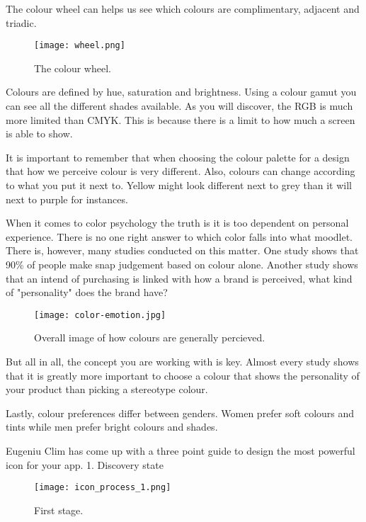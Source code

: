 The colour wheel can helps us see which colours are complimentary, adjacent and triadic. 
\begin{figure}[H]
\centering
\texttt{[image: wheel.png]}
\caption{The colour wheel. \cite{Colour}}
\end{figure}

Colours are defined by hue, saturation and brightness. 
Using a colour gamut you can see all the different shades available. As you will discover, the RGB is much more limited than CMYK. This is because there is a limit to how much a screen is able to show. 

It is important to remember that when choosing the colour palette for a design that how we perceive colour is very different. Also, colours can change according to what you put it next to. Yellow might look different next to grey than it will next to purple for instances. \cite{Colour}

When it comes to color psychology the truth is it is too dependent on personal experience. There is no one right answer to which color falls into what moodlet. \cite{ColourMeaning}
There is, however, many studies conducted on this matter. 
One study shows that 90\% of people make snap judgement based on colour alone. \cite{ColourMeaning} Another study shows that an intend of purchasing is linked with how a brand is perceived, what kind of "personality" does the brand have?\cite{ColourMeaning}

\begin{figure}[H]
\centering
\texttt{[image: color-emotion.jpg]}
\caption{Overall image of how colours are generally percieved. \cite{ColourMeaning}}
\end{figure}

But all in all, the concept you are working with is key. Almost every study shows that it is greatly more important to choose a colour that shows the personality of your product than picking a stereotype colour. \cite{ColourMeaning}

Lastly, colour preferences differ between genders. Women prefer soft colours and tints while men prefer bright colours and shades. \cite{ColourMeaning} 


Eugeniu Clim has come up with a three point guide to design the most powerful icon for your app. \cite{Icon}
1. Discovery state

\begin{figure}[H]
\centering
\texttt{[image: icon\_process\_1.png]}
\caption{First stage. \cite{Icon}}
\end{figure}



